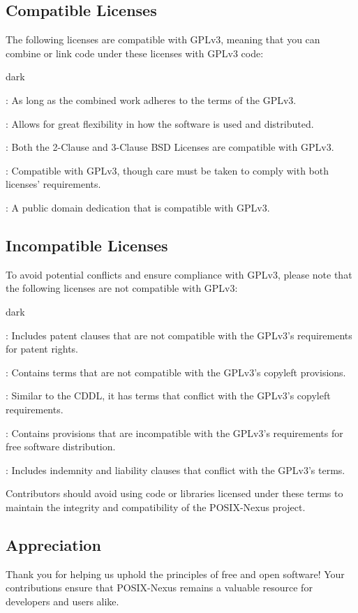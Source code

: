 \subsection{Compatible Licenses}
\label{sec:license:sub:compatable}
The following licenses are compatible with GPLv3, meaning that you can combine or link code under these licenses with GPLv3 code:
\bigskip
\begin{baseBoxOne}{}{dark}
    \begin{posnexItemize}
        \item[\sA] : As long as the combined work adheres to the terms of the GPLv3.
        \item[\sA] : Allows for great flexibility in how the software is used and distributed.
        \item[\sA] : Both the 2-Clause and 3-Clause BSD Licenses are compatible with GPLv3.
        \item[\sA] : Compatible with GPLv3, though care must be taken to comply with both licenses' requirements.
        \item[\sA] : A public domain dedication that is compatible with GPLv3.
    \end{posnexItemize}
\end{baseBoxOne}

\subsection{Incompatible Licenses}
\label{sec:license:sub:incompatible}
To avoid potential conflicts and ensure compliance with GPLv3, please note that the following licenses are not compatible with GPLv3:
\bigskip
\begin{baseBoxOne}{}{dark}
    \begin{posnexItemize}
        \item[\sA] : Includes patent clauses that are not compatible with the GPLv3's requirements for patent rights.
        \item[\sA] : Contains terms that are not compatible with the GPLv3's copyleft provisions.
        \item[\sA] : Similar to the CDDL, it has terms that conflict with the GPLv3's copyleft requirements.
        \item[\sA] : Contains provisions that are incompatible with the GPLv3's requirements for free software distribution.
        \item[\sA] : Includes indemnity and liability clauses that conflict with the GPLv3's terms.
    \end{posnexItemize}
\end{baseBoxOne}
\bigskip
Contributors should avoid using code or libraries licensed under these terms to maintain the integrity and compatibility of the POSIX-Nexus project.

\subsection{Appreciation}
\label{sec:license:sub:appreciation}
Thank you for helping us uphold the principles of free and open software! Your contributions ensure that POSIX-Nexus remains a valuable resource for developers and users alike.